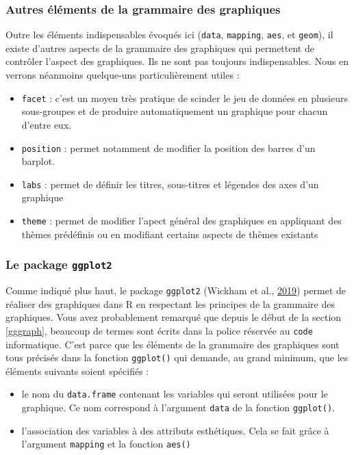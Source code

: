 \documentclass[a4paperpaper,]{article}
\providecommand{\tightlist}{%
  \setlength{\itemsep}{0pt}\setlength{\parskip}{0pt}}
\begin{document}
\hypertarget{autres-elements-de-la-grammaire-des-graphiques}{%
\subsubsection{Autres éléments de la grammaire des graphiques}\label{autres-elements-de-la-grammaire-des-graphiques}}

Outre les éléments indispensables évoqués ici (\texttt{data}, \texttt{mapping}, \texttt{aes}, et \texttt{geom}), il existe d'autres aspects de la grammaire des graphiques qui permettent de contrôler l'aspect des graphiques. Ils ne sont pas toujours indispensables. Nous en verrons néanmoins quelque-uns particulièrement utiles :

\begin{itemize}
\tightlist
\item
  \texttt{facet} : c'est un moyen très pratique de scinder le jeu de données en plusieurs sous-groupes et de produire automatiquement un graphique pour chacun d'entre eux.
\item
  \texttt{position} : permet notamment de modifier la position des barres d'un barplot.
\item
  \texttt{labs} : permet de définir les titres, sous-titres et légendes des axes d'un graphique
\item
  \texttt{theme} : permet de modifier l'apect général des graphiques en appliquant des thèmes prédéfinis ou en modifiant certains aspects de thèmes existants
\end{itemize}

\hypertarget{le-package-ggplot2}{%
\subsubsection{\texorpdfstring{Le package \texttt{ggplot2}}{Le package ggplot2}}\label{le-package-ggplot2}}

Comme indiqué plus haut, le package \texttt{ggplot2} (Wickham et al., \protect\hyperlink{ref-R-ggplot2}{2019}) permet de réaliser des graphiques dans R en respectant les principes de la grammaire des graphiques. Vous avez probablement remarqué que depuis le début de la section \ref{gggraph}, beaucoup de termes sont écrits dans la police réservée au \texttt{code} informatique. C'est parce que les éléments de la grammaire des graphiques sont tous précisés dans la fonction \texttt{ggplot()} qui demande, au grand minimum, que les éléments suivants soient spécifiés :

\begin{itemize}
\tightlist
\item
  le nom du \texttt{data.frame} contenant les variables qui seront utilisées pour le graphique. Ce nom correspond à l'argument \texttt{data} de la fonction \texttt{ggplot()}.
\item
  l'association des variables à des attributs esthétiques. Cela se fait grâce à l'argument \texttt{mapping} et la fonction \texttt{aes()}
\end{itemize}
\end{document}
